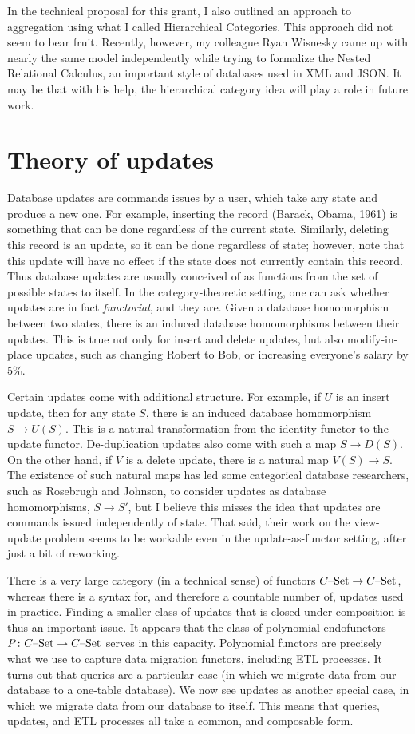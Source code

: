 \documentclass[11pt,oneside,article]{memoir}
\newcommand{\tn}[1]{\textnormal{#1}}
\newcommand{\set}{\tn{--Set}}
\begin{document}
In the technical proposal for this grant, I also outlined an approach to aggregation using what I called Hierarchical Categories. This approach did not seem to bear fruit. Recently, however, my colleague Ryan Wisnesky came up with nearly the same model independently while trying to formalize the Nested Relational Calculus, an important style of databases used in XML and JSON. It may be that with his help, the hierarchical category idea will play a role in future work.

\section{Theory of updates}

Database updates are commands issues by a user, which take any state and produce a new one. For example, inserting the record (Barack, Obama, 1961) is something that can be done regardless of the current state. Similarly, deleting this record is an update, so it can be done regardless of state; however, note that this update will have no effect if the state does not currently contain this record. Thus database updates are usually conceived of as functions from the set of possible states to itself. In the category-theoretic setting, one can ask whether updates are in fact \emph{functorial}, and they are. Given a database homomorphism between two states, there is an induced database homomorphisms between their updates. This is true not only for insert and delete updates, but also modify-in-place updates, such as changing Robert to Bob, or increasing everyone's salary by 5\%. 

Certain updates come with additional structure. For example, if $U$ is an insert update, then for any state $S$, there is an induced database homomorphism $S\to U(S)$. This is a natural transformation from the identity functor to the update functor. De-duplication updates also come with such a map $S\to D(S)$. On the other hand, if $V$ is a delete update, there is a natural map $V(S)\to S$. The existence of such natural maps has led some categorical database researchers, such as Rosebrugh and Johnson, to consider updates as database homomorphisms, $S\to S'$, but I believe this misses the idea that updates are commands issued independently of state. That said, their work on the view-update problem seems to be workable even in the update-as-functor setting, after just a bit of reworking. 

There is a very large category (in a technical sense) of functors $C\set\to C\set$, whereas there is a syntax for, and therefore a countable number of, updates used in practice. Finding a smaller class of updates that is closed under composition is thus an important issue. It appears that the class of polynomial endofunctors $P\colon C\set\to C\set$ serves in this capacity. Polynomial functors are precisely what we use to capture data migration functors, including ETL processes. It turns out that queries are a particular case (in which we migrate data from our database to a one-table database). We now see updates as another special case, in which we migrate data from our database to itself. This means that queries, updates, and ETL processes all take a common, and composable form. 
\end{document}
